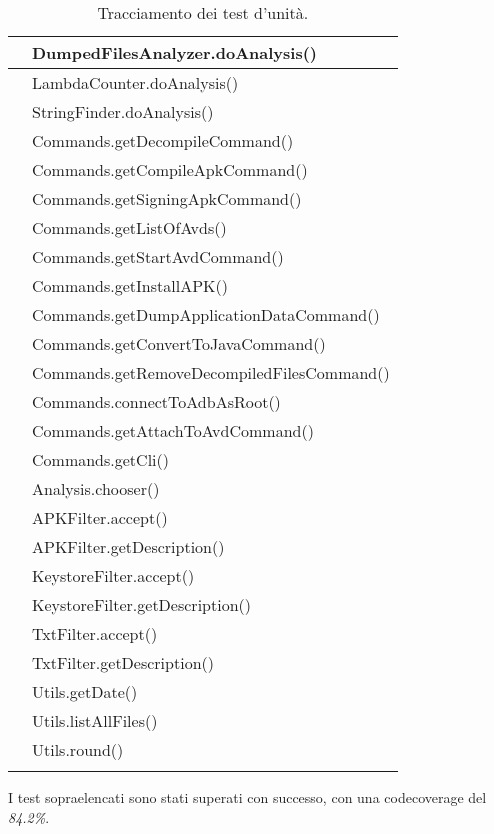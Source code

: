 \begin{longtable}{ |C{3cm} |C{10.5cm}|}
     & DumpedFilesAnalyzer.doAnalysis()           \\\hline
     & LambdaCounter.doAnalysis()                 \\\hline
     & StringFinder.doAnalysis()                  \\\hline
     & Commands.getDecompileCommand()             \\\hline
     & Commands.getCompileApkCommand()            \\\hline
     & Commands.getSigningApkCommand()            \\\hline
     & Commands.getListOfAvds()                   \\\hline
     & Commands.getStartAvdCommand()              \\\hline
     & Commands.getInstallAPK()                   \\\hline
     & Commands.getDumpApplicationDataCommand()   \\\hline
     & Commands.getConvertToJavaCommand()         \\\hline
     & Commands.getRemoveDecompiledFilesCommand() \\\hline
     & Commands.connectToAdbAsRoot()              \\\hline
     & Commands.getAttachToAvdCommand()           \\\hline
     & Commands.getCli()                          \\\hline
     & Analysis.chooser()                         \\\hline
     & APKFilter.accept()                         \\\hline
     & APKFilter.getDescription()                 \\\hline
     & KeystoreFilter.accept()                    \\\hline
     & KeystoreFilter.getDescription()            \\\hline
     & TxtFilter.accept()                         \\\hline
     & TxtFilter.getDescription()                 \\\hline
     & Utils.getDate()                            \\\hline
     & Utils.listAllFiles()                       \\\hline
     & Utils.round()                              \\\hline
    \caption{Tracciamento dei test d'unità.}
\end{longtable}

I test sopraelencati sono stati superati con successo, con una \gls{codecoverage} del \textit{84.2\%}.
\newpage